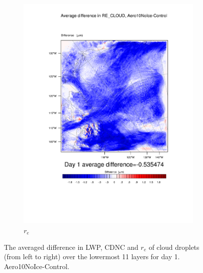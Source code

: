 \begin{figure}[hb]
	\begin{subfigure}{0.48\textwidth}
		\centering
		\includegraphics[width=\textwidth]{results/aero10ni/diff_Aero10NoIce_RE_CLOUD_Day1.pdf}
		\caption{$r_e$}
		\label{subfig:recloud_r4Day1}
	\end{subfigure}
\caption{The averaged difference in LWP, CDNC and $r_e$ of cloud droplets (from left to right) over the lowermost 11 layers for day 1. Aero10NoIce-Control.}
\label{fig:lwpcdncre_r4Day1}
\end{figure}

